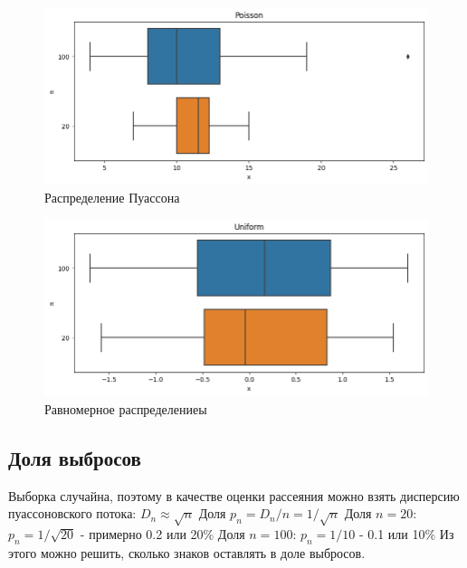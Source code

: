 \begin{figure}[H]
	\begin{center}
		\includegraphics[width=\textwidth]{tasks/3/res/4.png}
		\caption{Распределение Пуассона}
	\end{center}
\end{figure}

\begin{figure}[H]
	\begin{center}
		\includegraphics[width=\textwidth]{tasks/3/res/5.png}
		\caption{Равномерное распределениеы}
	\end{center}
\end{figure}


\subsection{Доля выбросов}
Выборка случайна, поэтому в качестве оценки рассеяния можно взять дисперсию пуассоновского потока: $D_n \approx \sqrt{n}$ \newline
Доля $p_n = D_n / n = 1 / \sqrt{n}$ \newline
Доля $n = 20$: $p_n = 1 / \sqrt{20}$ - примерно 0.2 или 20\% \newline
Доля $n = 100$: $p_n = 1 / 10$ - 0.1 или 10\% \newline
Из этого можно решить, сколько знаков оставлять в доле выбросов. \newline

